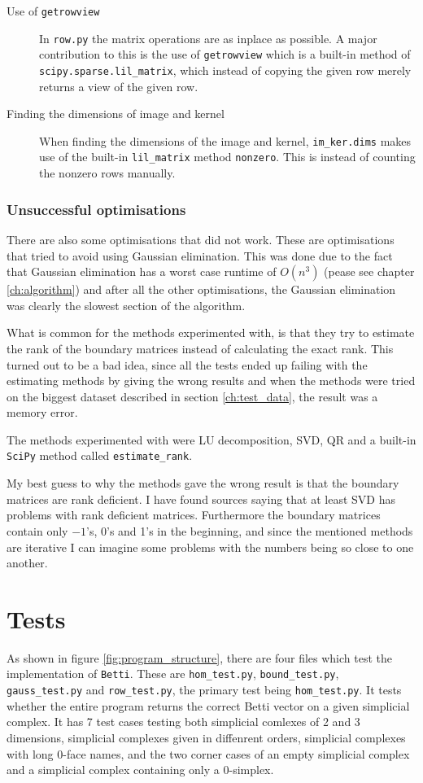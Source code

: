 \documentclass[11pt,a4paper,twoside]{report}
\begin{document}
\begin{description}
\item[Use of \texttt{getrowview}] In \texttt{row.py} the matrix operations are as inplace as possible. A major contribution to this is the use of \texttt{getrowview} which is a built-in method of \texttt{scipy.sparse.lil\_matrix}, which instead of copying the given row merely returns a view of the given row. 
\item[Finding the dimensions of image and kernel] When finding the dimensions of the image and kernel, \texttt{im\_ker.dims} makes use of the built-in \texttt{lil\_matrix} method \texttt{nonzero}. This is instead of counting the nonzero rows manually.
\end{description}
\subsubsection{Unsuccessful optimisations}
There are also some optimisations that did not work. These are optimisations that tried to avoid using Gaussian elimination. This was done due to the fact that Gaussian elimination has a worst case runtime of $O(n^3)$ (pease see chapter \ref{ch:algorithm}) and after all the other optimisations, the Gaussian elimination was clearly the slowest section of the algorithm.

What is common for the methods experimented with, is that they try to estimate the rank of the boundary matrices instead of calculating the exact rank. This turned out to be a bad idea, since all the tests ended up failing with the estimating methods by giving the wrong results and when the methods were tried on the biggest dataset described in section \ref{ch:test_data}, the result was a memory error. 

The methods experimented with were LU decomposition, SVD, QR and a built-in \texttt{SciPy} method called \texttt{estimate\_rank}.

My best guess to why the methods gave the wrong result is that the boundary matrices are rank deficient. I have found sources saying that at least SVD \cite{wikiSVD} has problems with rank deficient matrices. Furthermore the boundary matrices contain only $-1$'s, 0's and 1's in the beginning, and since the mentioned methods are iterative I can imagine some problems with the numbers being so close to one another.
\section{Tests}
As shown in figure \ref{fig:program_structure}, there are four files which test the implementation of \texttt{Betti}. These are \texttt{hom\_test.py}, \texttt{bound\_test.py}, \texttt{gauss\_test.py} and \texttt{row\_test.py}, the primary test being \texttt{hom\_test.py}. It tests whether the entire program returns the correct Betti vector on a given simplicial complex. It has 7 test cases testing both simplicial comlexes of 2 and 3 dimensions, simplicial complexes given in diffenrent orders, simplicial complexes with long 0-face names, and the two corner cases of an empty simplicial complex and a simplicial complex containing only a 0-simplex. 
\end{document}
